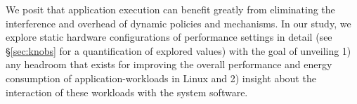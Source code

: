 We posit that application execution can benefit greatly from eliminating the interference and overhead of dynamic policies and mechanisms. In our study, we explore static hardware configurations of performance settings in detail (see \S\ref{sec:knobs} for a quantification of explored values) with the goal of unveiling 1) any headroom that exists for improving the overall performance and energy consumption of application-workloads in Linux and 2) insight about the interaction of these workloads with the system software.




